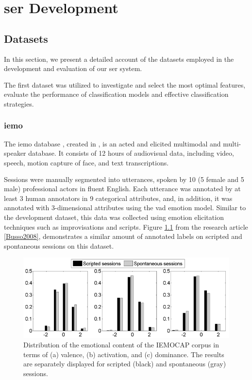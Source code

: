 \chapter{\ac{ser} Development}
\label{chapter:strat}

\section{Datasets}

In this section, we present a detailed account of the datasets employed in the development and evaluation of our \ac{ser} system.

The first dataset was utilized to investigate and select the most optimal features, evaluate the performance of classification models and effective classification strategies.

\subsection{\ac{iemo}}

The \ac{iemo} database \cite{Busso2008}, created in \citeyear{Busso2008}, is an acted and elicited multimodal and multi-speaker database. It consists of 12 hours of audiovisual data, including video, speech, motion capture of face, and text transcriptions.

Sessions were manually segmented into utterances, spoken by 10 (5 female and 5 male) professional actors in fluent English. Each utterance was annotated by at least 3 human annotators in 9 categorical attributes, and, in addition, it was annotated with 3-dimensional attributes using the \ac{vad} emotion model. Similar to the development dataset, this data was collected using emotion elicitation techniques such as improvisations and scripts. Figure \ref{fig:bar_plots_distribution} from the research article \ref{Busso2008}, demonstrates a similar amount of annotated labels on scripted and spontaneous sessions on this dataset.

\begin{figure}[H]
	\centering
	\includegraphics[width=.8\linewidth]{figs/4_1_traditional/scripted_spont_distribution.png}
	\caption{Distribution of the emotional content of the IEMOCAP corpus in terms of (a) valence, (b) activation, and (c) dominance. The results are separately displayed for scripted (black) and spontaneous (gray) sessions.}
	\label{fig:bar_plots_distribution}
\end{figure}

